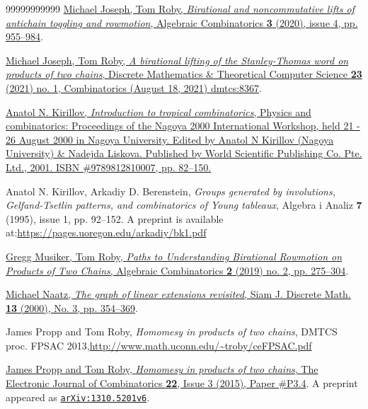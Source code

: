 \documentclass[numbers=enddot,12pt,final,onecolumn,notitlepage]{scrartcl}%
\theoremstyle{definition}
\begin{document}
\begin{thebibliography}{99999999999}
\href{https://doi.org/10.5802/alco.125}{Michael
Joseph, Tom Roby, \textit{Birational and noncommutative lifts of antichain
toggling and rowmotion}, Algebraic Combinatorics \textbf{3} (2020), issue 4,
pp. 955--984}.

\href{https://doi.org/10.46298/dmtcs.6633}{Michael
Joseph, Tom Roby, \textit{A birational lifting of the Stanley-Thomas word on
products of two chains}, Discrete Mathematics \& Theoretical Computer Science
\textbf{23} (2021) no. 1, Combinatorics (August 18, 2021) dmtcs:8367}.

%
\href{https://doi.org/10.1142/9789812810007_0005}{Anatol N. Kirillov,
\textit{Introduction to tropical combinatorics}, Physics and combinatorics:
Proceedings of the Nagoya 2000 International Workshop, held 21 - 26 August
2000 in Nagoya University. Edited by Anatol N Kirillov (Nagoya University) \&
Nadejda Liskova. Published by World Scientific Publishing Co. Pte. Ltd., 2001.
ISBN \#9789812810007, pp. 82--150.}

Anatol N. Kirillov, Arkadiy D.
Berenstein, \textit{Groups generated by involutions, Gelfand-Tsetlin patterns,
and combinatorics of Young tableaux}, Algebra i Analiz \textbf{7} (1995),
issue 1, pp. 92--152. A preprint is available at:\newline\url{https://pages.uoregon.edu/arkadiy/bk1.pdf}

\href{https://doi.org/10.5802/alco.43}{Gregg
Musiker, Tom Roby, \textit{Paths to Understanding Birational Rowmotion on
Products of Two Chains}, Algebraic Combinatorics \textbf{2} (2019) no. 2, pp.
275--304}.

%
\href{https://doi.org/10.1137/s0895480199352609}{Michael Naatz, \textit{The
graph of linear extensions revisited}, Siam J. Discrete Math. \textbf{13}
(2000), No. 3, pp. 354--369}.

James Propp and Tom Roby, \textit{Homomesy in
products of two chains}, DMTCS proc. FPSAC 2013,\newline\url{http://www.math.uconn.edu/~troby/ceFPSAC.pdf}

\href{https://doi.org/10.37236/3579}{James
Propp and Tom Roby, \textit{Homomesy in products of two chains}, The
Electronic Journal of Combinatorics \textbf{22}, Issue 3 (2015), Paper
\#P3.4}. A preprint appeared as
\href{http://arxiv.org/abs/1310.5201v6}{\texttt{arXiv:1310.5201v6}}.


\end{thebibliography}
\end{document}
